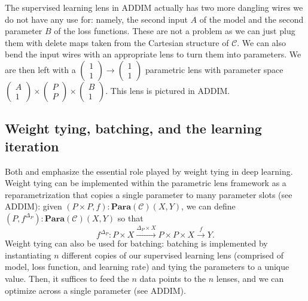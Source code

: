 \documentclass[11pt,a4paper,openright,twoside]{report}
\theoremstyle{plain}
\theoremstyle{definition}
\begin{document}
The supervised learning lens in ADDIM actually has two more dangling wires we do not have any use for: namely, the second input $A$ of the model and the second parameter $B$ of the loss functions. These are not a problem as we can just plug them with delete maps taken from the Cartesian structure of $\mathcal{C}$. We can also bend the input wires with an appropriate lens to turn them into parameters. We are then left with a $\left(\begin{smallmatrix} 1 \\ 1 \end{smallmatrix}\right) \to \left(\begin{smallmatrix} 1 \\ 1 \end{smallmatrix}\right)$ parametric lens with parameter space $\left(\begin{smallmatrix} A \\ 1 \end{smallmatrix}\right) \times \left(\begin{smallmatrix} P \\ P \end{smallmatrix}\right) \times \left(\begin{smallmatrix} B \\ 1 \end{smallmatrix}\right)$. This lens is pictured in ADDIM.




\subsection{Weight tying, batching, and the learning iteration}

Both \cite{cruttwell2022categorical} and \cite{gavranovic2024fundamental} emphasize the essential role played by weight tying in deep learning. Weight tying can be implemented within the parametric lens framework as a reparametrization that copies a single parameter to many parameter slots (see ADDIM): given $(P \times P, f): \mathbf{Para}(\mathcal{C})(X,Y)$, we can define $(P, f^{\Delta_P}): \mathbf{Para}(\mathcal{C})(X,Y)$ so that
\[f^{\Delta_P}: P \times X \stackrel{\Delta_P \times X}{\longrightarrow} P \times P \times X \stackrel{f}{\longrightarrow} Y.\]
Weight tying can also be used for batching: batching is implemented by instantiating $n$ different copies of our supervised learning lens (comprised of model, loss function, and learning rate) and tying the parameters to a unique value. Then, it suffices to feed the $n$ data points to the $n$ lenses, and we can optimize across a single parameter (see ADDIM).
\end{document}
